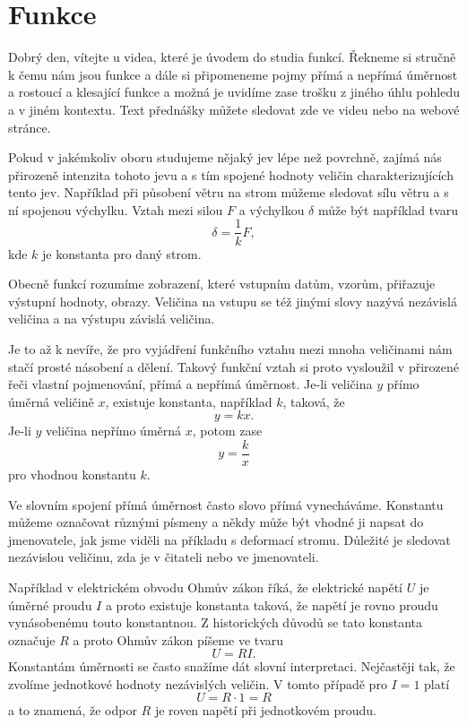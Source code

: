 \documentclass[12pt]{article}
\begin{document}
\section*{Funkce}

Dobrý den, vítejte u videa, které je úvodem do studia funkcí. Řekneme si stručně k čemu nám jsou funkce a dále si připomeneme pojmy přímá a nepřímá úměrnost a rostoucí a klesající funkce a možná je uvidíme zase trošku z jiného úhlu pohledu a v jiném kontextu. Text přednášky můžete sledovat zde ve videu nebo na webové stránce.

Pokud v jakémkoliv oboru studujeme nějaký jev lépe než povrchně, zajímá nás přirozeně intenzita tohoto jevu a s tím spojené hodnoty veličin charakterizujících tento jev. Například při působení větru na strom můžeme sledovat sílu větru a s ní spojenou výchylku. Vztah mezi silou $F$ a výchylkou $\delta$ může být například tvaru $$\delta=\frac 1k F,$$ kde $k$ je konstanta pro daný strom.

Obecně funkcí rozumíme zobrazení, které vstupním datům, vzorům, přiřazuje výstupní hodnoty, obrazy. Veličina na vstupu se též jinými slovy nazývá nezávislá veličina a na výstupu závislá veličina.

Je to až k nevíře, že pro vyjádření funkčního vztahu mezi mnoha veličinami nám stačí prosté násobení a dělení. Takový funkční vztah si proto vysloužil v přirozené řeči vlastní pojmenování, přímá a nepřímá úměrnost. Je-li veličina $y$ přímo úměrná veličině $x$, existuje konstanta, například $k$, taková, že $$y=kx.$$ Je-li $y$ veličina nepřímo úměrná $x$, potom zase $$y=\frac kx$$ pro vhodnou konstantu $k$.

Ve slovním spojení přímá úměrnost často slovo přímá vynecháváme. Konstantu můžeme označovat různými písmeny a někdy může být vhodné ji napsat do jmenovatele, jak jsme viděli na příkladu s deformací stromu. Důležité je sledovat nezávislou veličinu, zda je v čitateli nebo ve jmenovateli.

Například v elektrickém obvodu Ohmův zákon říká, že elektrické napětí $U$ je úměrné proudu $I$ a proto existuje konstanta taková, že napětí je rovno proudu vynásobenému touto konstantnou. Z historických důvodů se tato konstanta označuje $R$ a proto Ohmův zákon píšeme ve tvaru $$U=RI.$$ Konstantám úměrnosti se často snažíme dát slovní interpretaci. Nejčastěji tak, že zvolíme jednotkové hodnoty nezávislých veličin. V tomto případě pro $I=1$ platí $$U=R\cdot 1=R$$ a to znamená, že odpor $R$ je roven napětí při jednotkovém proudu.
\end{document}
